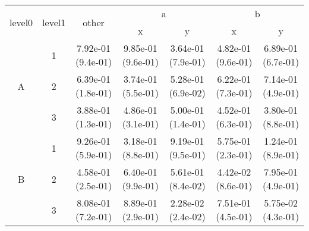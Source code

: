 \begin{tabular}{ccccccc}
\toprule
\multirow{2}{*}{level0} & \multirow{2}{*}{level1}& \multirow{2}{*}{other}&\multicolumn{2}{c}{a}&\multicolumn{2}{c}{b}\tabularnewline
\cmidrule(lr){4-5}
\cmidrule(lr){6-7}
&&&x&y&x&y\tabularnewline
\midrule
\multirow{3}{*}{A}&1& 7.92e-01 (9.4e-01)& 9.85e-01 (9.6e-01)& 3.64e-01 (7.9e-01)& 4.82e-01 (9.6e-01)& 6.89e-01 (6.7e-01)\tabularnewline
&2& 6.39e-01 (1.8e-01)& 3.74e-01 (5.5e-01)& 5.28e-01 (6.9e-02)& 6.22e-01 (7.3e-01)& 7.14e-01 (4.9e-01)\tabularnewline
&3& 3.88e-01 (1.3e-01)& 4.86e-01 (3.1e-01)& 5.00e-01 (1.4e-01)& 4.52e-01 (6.3e-01)& 3.80e-01 (8.8e-01)\tabularnewline
\midrule
\multirow{3}{*}{B}&1& 9.26e-01 (5.9e-01)& 3.18e-01 (8.8e-01)& 9.19e-01 (9.5e-01)& 5.75e-01 (2.3e-01)& 1.24e-01 (8.9e-01)\tabularnewline
&2& 4.58e-01 (2.5e-01)& 6.40e-01 (9.9e-01)& 5.61e-01 (8.4e-02)& 4.42e-02 (8.6e-01)& 7.95e-01 (4.9e-01)\tabularnewline
&3& 8.08e-01 (7.2e-01)& 8.89e-01 (2.9e-01)& 2.28e-02 (2.4e-02)& 7.51e-01 (4.5e-01)& 5.75e-02 (4.3e-01)\tabularnewline
\bottomrule
\end{tabular}
